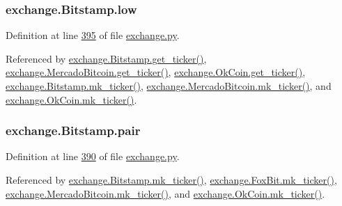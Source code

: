 \subsubsection[{\texorpdfstring{low}{low}}]{\setlength{\rightskip}{0pt plus 5cm}exchange.\+Bitstamp.\+low}\hypertarget{classexchange_1_1_bitstamp_a42d49d824732f16b57f677e8482e49b7}{}\label{classexchange_1_1_bitstamp_a42d49d824732f16b57f677e8482e49b7}


Definition at line \hyperlink{exchange_8py_source_l00395}{395} of file \hyperlink{exchange_8py_source}{exchange.\+py}.



Referenced by \hyperlink{exchange_8py_source_l00401}{exchange.\+Bitstamp.\+get\+\_\+ticker()}, \hyperlink{exchange_8py_source_l00535}{exchange.\+Mercado\+Bitcoin.\+get\+\_\+ticker()}, \hyperlink{exchange_8py_source_l00600}{exchange.\+Ok\+Coin.\+get\+\_\+ticker()}, \hyperlink{exchange_8py_source_l00415}{exchange.\+Bitstamp.\+mk\+\_\+ticker()}, \hyperlink{exchange_8py_source_l00549}{exchange.\+Mercado\+Bitcoin.\+mk\+\_\+ticker()}, and \hyperlink{exchange_8py_source_l00614}{exchange.\+Ok\+Coin.\+mk\+\_\+ticker()}.

\subsubsection[{\texorpdfstring{pair}{pair}}]{\setlength{\rightskip}{0pt plus 5cm}exchange.\+Bitstamp.\+pair}\hypertarget{classexchange_1_1_bitstamp_adf1f8e926f0cedb79bf57ab2dfa31776}{}\label{classexchange_1_1_bitstamp_adf1f8e926f0cedb79bf57ab2dfa31776}


Definition at line \hyperlink{exchange_8py_source_l00390}{390} of file \hyperlink{exchange_8py_source}{exchange.\+py}.



Referenced by \hyperlink{exchange_8py_source_l00415}{exchange.\+Bitstamp.\+mk\+\_\+ticker()}, \hyperlink{exchange_8py_source_l00474}{exchange.\+Fox\+Bit.\+mk\+\_\+ticker()}, \hyperlink{exchange_8py_source_l00549}{exchange.\+Mercado\+Bitcoin.\+mk\+\_\+ticker()}, and \hyperlink{exchange_8py_source_l00614}{exchange.\+Ok\+Coin.\+mk\+\_\+ticker()}.

